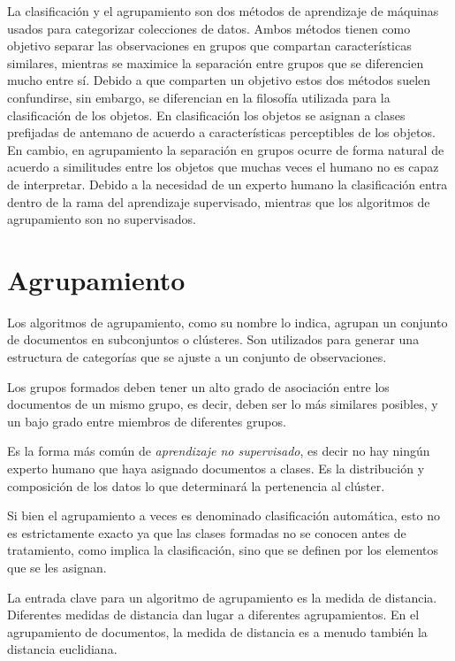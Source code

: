 \documentclass{llncs}
\begin{document}
La clasificaci\'on y el agrupamiento son dos m\'etodos de aprendizaje de m\'aquinas usados para categorizar colecciones de datos. Ambos m\'etodos tienen como objetivo separar las observaciones en grupos que compartan caracter\'isticas similares, mientras se maximice la separaci\'on entre grupos que se diferencien mucho entre s\'i. Debido a que comparten un objetivo estos dos m\'etodos suelen confundirse, sin embargo, se diferencian en la filosof\'ia utilizada para la clasificaci\'on de los objetos. En clasificaci\'on los objetos se asignan a clases prefijadas de antemano de acuerdo a caracter\'isticas perceptibles de los objetos. En cambio, en agrupamiento la separaci\'on en grupos ocurre de forma natural de acuerdo a similitudes entre los objetos que muchas veces el humano no es capaz de interpretar. Debido a la necesidad de un experto humano la clasificaci\'on entra dentro de la rama del aprendizaje supervisado, mientras que los algoritmos de agrupamiento son no supervisados.

\section{Agrupamiento}

Los algoritmos de agrupamiento, como su nombre lo indica, agrupan un conjunto de documentos en subconjuntos o clústeres. Son utilizados para generar una estructura de categorías que se ajuste a un conjunto de observaciones. 

Los grupos formados deben tener un alto grado de asociación entre los documentos de un mismo grupo, es decir, deben ser lo m\'as similares posibles, y un bajo grado entre miembros de diferentes grupos. 

Es la forma más común de \textit{aprendizaje no supervisado}, es decir no hay ningún experto humano que haya asignado documentos a clases. Es la distribución y composición de los datos lo que determinará la pertenencia al clúster. 

Si bien el agrupamiento a veces es denominado clasificación automática, esto no es estrictamente exacto ya que las clases formadas no se conocen antes de tratamiento, como implica la clasificación, sino que se definen por los elementos que se les asignan.

La entrada clave para un algoritmo de agrupamiento es la medida de distancia. Diferentes medidas de distancia dan lugar a diferentes agrupamientos. En el agrupamiento de documentos, la medida de distancia es a menudo también la distancia euclidiana. 
\end{document}
